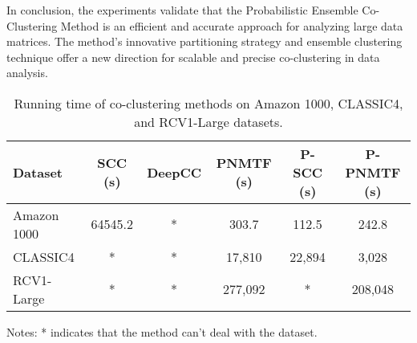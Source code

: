 In conclusion, the experiments validate that the Probabilistic Ensemble Co-Clustering Method is an efficient and accurate approach for analyzing large data matrices. The method's innovative partitioning strategy and ensemble clustering technique offer a new direction for scalable and precise co-clustering in data analysis.

\begin{table}[htbp]
    \centering
    \caption{Running time of co-clustering methods on Amazon 1000, CLASSIC4, and RCV1-Large datasets.}
    \label{tab:running-time}
    \begin{tabular}{@{} l ccccc @{}}
        \toprule
        Dataset     & SCC (s) & DeepCC & PNMTF (s) & P-SCC (s) & P-PNMTF (s) \\
        \midrule
        Amazon 1000 & 64545.2 & *      & 303.7     & 112.5     & 242.8       \\
        CLASSIC4    & *       & *      & 17,810    & 22,894    & 3,028       \\
        RCV1-Large  & *       & *      & 277,092   & *         & 208,048     \\
        \bottomrule
    \end{tabular}
    \begin{tablenotes}
        \small
        \item Notes: * indicates that the method can't deal with the dataset.
    \end{tablenotes}
\end{table}

